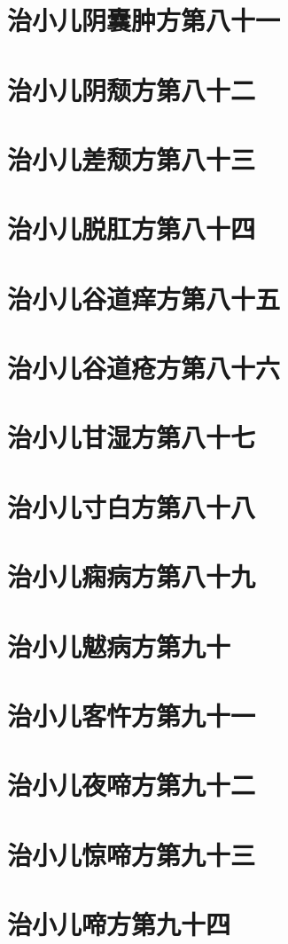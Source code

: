 \documentclass[a4paper,12pt,UTF8,twoside]{ctexbook}
\begin{document}
\chapter{治小儿阴囊肿方第八十一}
\chapter{治小儿阴颓方第八十二}
\chapter{治小儿差颓方第八十三}
\chapter{治小儿脱肛方第八十四}
\chapter{治小儿谷道痒方第八十五}
\chapter{治小儿谷道疮方第八十六}
\chapter{治小儿甘湿方第八十七}
\chapter{治小儿寸白方第八十八}
\chapter{治小儿痫病方第八十九}
\chapter{治小儿魃病方第九十}
\chapter{治小儿客忤方第九十一}
\chapter{治小儿夜啼方第九十二}
\chapter{治小儿惊啼方第九十三}
\chapter{治小儿啼方第九十四}
\end{document}

